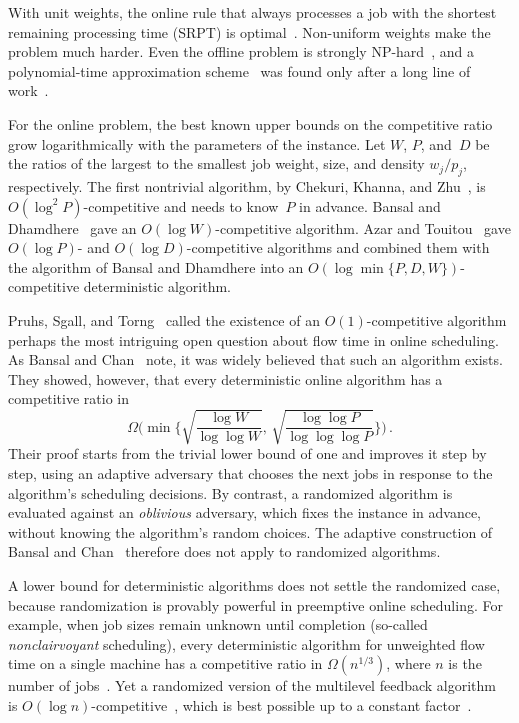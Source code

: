 \documentclass[11pt,letterpaper]{article}
\theoremstyle{definition}
\theoremstyle{remark}
\begin{document}
With unit weights, the online rule that always processes a job with the shortest remaining processing time (SRPT) is optimal~\cite{Schrage68}. Non-uniform weights make the problem much harder. Even the offline problem is strongly NP-hard~\cite{LabetoulleLLR84}, and a polynomial-time approximation scheme~\cite{ArmbrusterRW26} was found only after a long line of work~\cite{ChekuriK02,BansalP14,BatraGK23,FeigeKL19,RohwedderW21}.

For the online problem, the best known upper bounds on the competitive ratio grow logarithmically with the parameters of the instance. Let $W$, $P$, and~$D$ be the ratios of the largest to the smallest job weight, size, and density $w_j/p_j$, respectively. The first nontrivial algorithm, by Chekuri, Khanna, and Zhu~\cite{ChekuriKZ01}, is $O(\log^2P)$-competitive and needs to know~$P$ in advance. Bansal and Dhamdhere~\cite{BansalD07} gave an $O(\log W)$-competitive algorithm. Azar and Touitou~\cite{AzarT18} gave $O(\log P)$- and $O(\log D)$-competitive algorithms and combined them with the algorithm of Bansal and Dhamdhere into an $O(\log\min\{P,D,W\})$-competitive deterministic algorithm.

Pruhs, Sgall, and Torng~\cite{PruhsST04} called the existence of an $O(1)$-competitive algorithm perhaps the most intriguing open question about flow time in online scheduling. As Bansal and Chan~\cite{BansalC09} note, it was widely believed that such an algorithm exists. They showed, however, that every deterministic online algorithm has a competitive ratio in
\begin{equation*}
  \Omega\biggl(\min\biggl\{\sqrt{\frac{\log W}{\log\log W}},\,\sqrt{\frac{\log\log P}{\log\log\log P}}\biggr\}\biggr)\,.
\end{equation*}
Their proof starts from the trivial lower bound of one and improves it step by step, using an adaptive adversary that chooses the next jobs in response to the algorithm's scheduling decisions. By contrast, a randomized algorithm is evaluated against an \emph{oblivious} adversary, which fixes the instance in advance, without knowing the algorithm's random choices. The adaptive construction of Bansal and Chan~\cite{BansalC09} therefore does not apply to randomized algorithms.

A lower bound for deterministic algorithms does not settle the randomized case, because randomization is provably powerful in preemptive online scheduling. For example, when job sizes remain unknown until completion (so-called \emph{nonclairvoyant} scheduling), every deterministic algorithm for unweighted flow time on a single machine has a competitive ratio in $\Omega(n^{1/3})$, where $n$ is the number of jobs~\cite{MotwaniPT94}. Yet a randomized version of the multilevel feedback algorithm~\cite{KalyanasundaramP03} is $O(\log n)$-competitive~\cite{BecchettiL04}, which is best possible up to a constant factor~\cite{MotwaniPT94}.
\end{document}
